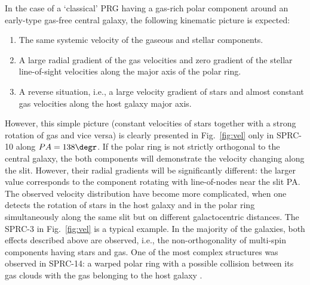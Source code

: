 \documentclass[useAMS,usenatbib]{mnras}
\begin{document}
In the case of a `classical' PRG having a gas-rich polar component around an early-type gas-free central galaxy, the  following kinematic  picture is expected:
\begin{enumerate}
    \item The same systemic velocity of the gaseous and stellar components.
    \item A large radial gradient of the gas velocities and zero gradient of the stellar line-of-sight velocities  along the major axis of the polar ring.   
    \item  A reverse situation, i.e., a large velocity gradient of stars and almost constant gas velocities along the host galaxy major axis.
\end{enumerate} 



However, this  simple picture (constant velocities of stars  together with a strong rotation of gas and vice versa) is clearly presented in Fig.~\ref{fig:vel} only in SPRC-10 along $PA=138\degr$. If the polar ring is not strictly orthogonal to the central galaxy, the both components will demonstrate the velocity changing along the slit. However, their radial gradients will be significantly different: the larger value corresponds to the component rotating with line-of-nodes near the slit PA. The observed velocity distribution have become more complicated, when one detects the rotation of stars  in the host  galaxy and in the  polar ring simultaneously along  the same slit but on  different galactocentric distances. The SPRC-3 in Fig.~\ref{fig:vel} is a typical example. In the majority of the galaxies, both effects  described above are observed, i.e., the non-orthogonality of multi-spin components having  stars and gas. One of the most complex structures was observed in SPRC-14: a warped polar ring with a possible  collision between its gas clouds with the gas belonging to the host galaxy \citep[see also][]{sprc}.   
\end{document}
